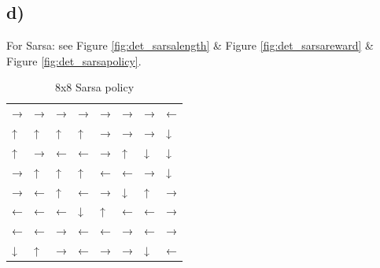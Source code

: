 \documentclass[a4paper]{article}
\begin{document}
\newpage
\subsection*{d)}

For Sarsa: see Figure \ref{fig:det_sarsalength} \& Figure \ref{fig:det_sarsareward} \& Figure \ref{fig:det_sarsapolicy}.

\begin{table}[!ht]
	\centering
	\begin{tabular}{llllllll}
		→ & → & → & → & → & → & → & ←
\\
		↑ & ↑ & ↑ & ↑ & → & → & → & ↓
\\
		↑ & → & ← & ← & → & ↑ & ↓ & ↓
\\
		→ & ↑ & ↑ & ↑ & ← & ← & → & ↓
\\
		→ & ← & ↑ & ← & → & ↓ & ↑ & →
\\
		← & ← & ← & ↓ & ↑ & ← & ← & →
\\
		← & ← & → & ← & ← & → & ← & →
\\
		↓ & ↑ & → & ← & → & → & ↓ & ←
	\end{tabular}
	\caption{8x8 Sarsa policy}
\end{table}
\end{document}
